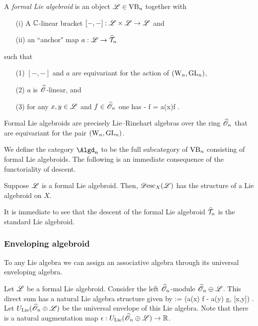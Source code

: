 \begin{dfn} A {\em formal Lie algebroid} is an object $\mathscr L \in {\rm VB}_n$ together with
\begin{itemize}
\item[(i)] A $\mathbb C$-linear bracket $[-,-] : \mathscr L \times \mathscr L \to \mathscr L$ and
\item[(ii)] an ``anchor" map $a : \mathscr L \to \widehat{\mathcal T}_n$
\end{itemize}
such that 
\begin{itemize}
\item[(1)] $[-,-]$ and $a$ are equivariant for the action of $({{\rm W}_n}, {\rm GL}_n)$,
\item[(2)] $a$ is $\widehat{\mathscr O}$-linear, and
\item[(3)] for any $x,y\in \mathscr L$ and $f \in \widehat{\mathscr O}_n$ one has
\ben
[x, f \cdot y] -  f \cdot [x,y]  = a(x)\cdot f .
\een
\end{itemize}
\end{dfn}

\begin{rmk} Formal Lie algebroids are precisely Lie--Rinehart algebras over the ring $\widehat{\mathscr O}_n$ that are equivariant for the pair $({{\rm W}_n}, {\rm GL}_n)$. 
\end{rmk}

We define the category $\Algd_n$ to be the full subcategory of ${\rm VB}_n$ consisting of formal Lie algebroids.
The following is an immediate consequence of the functoriality of descent.

\begin{lem}
Suppose $\mathscr L$ is a formal Lie algebroid. 
Then, $\mathscr{D}{\rm esc}_X(\mathscr L)$ has the structure of a Lie algebroid on $X$.
\end{lem}

It is immediate to see that the descent of the formal Lie algebroid $\widehat{\mathcal T}_n$ is the standard Lie algebroid. 

\subsubsection{Enveloping algebroid}

To any Lie algebra we can assign an associative algebra through its universal enveloping algebra. 

Let $\mathscr L$ be a formal Lie algebroid. Consider the left $\widehat{\mathscr O}_n$-module
$\widehat{\mathscr O}_n \oplus \mathscr L$. This direct sum has a natural Lie algebra
structure given by
\ben
[(f, x), (g,y)] := (a(x) \cdot f - a(y) \cdot g, [x,y]) .
\een 
Let $U_{\rm Lie}(\widehat{\mathscr O}_n \oplus \mathscr L)$ be the universal envelope of this
Lie algebra. 
Note that there is a natural augmentation map $\epsilon : U_{\rm Lie}(\widehat{\mathscr O}_n \oplus \mathscr L) \to \mathbb R$.

